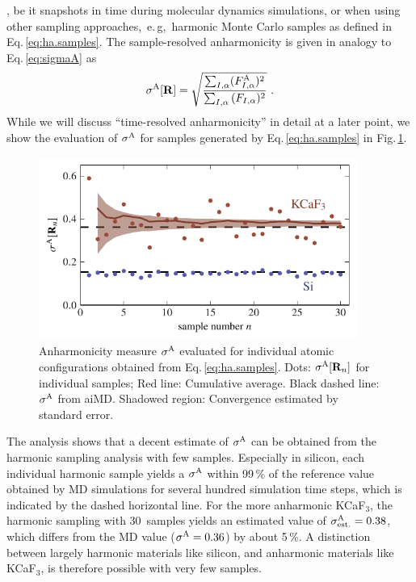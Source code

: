 , be it snapshots in time during molecular dynamics simulations, or when using other sampling approaches,~e.\,g,~harmonic Monte Carlo samples as defined in Eq.\,\eqref{eq:ha.samples}. The sample-resolved anharmonicity is given in analogy to Eq.\,\eqref{eq:sigmaA} as
\begin{align}
	\sigmaA [{\bf R}]
		= \sqrt{\frac{\sum_{I, \alpha} (F^{\rm A}_{I, \alpha})^2}{\sum_{I, \alpha} {(F_{I, \alpha})^2}}}~.
	\label{eq:sigmaA.sample}
\end{align}
While we will discuss ``time-resolved anharmonicity'' in detail at a later point, we show the evaluation of $\sigma^\mathrm{A}$ for samples generated by Eq.\,\eqref{eq:ha.samples} in Fig.\,\ref{fig:anh.sampling}.
\begin{figure}
	\includegraphics[width=4.1in]{./data/plots/anharmonicity/7_sampling/convergence_sigma_MC.pdf}
	\caption{
			Anharmonicity measure $\sigma^\mathrm{A}$ evaluated for individual atomic configurations obtained from Eq.\,\eqref{eq:ha.samples}. Dots: $\sigma^\mathrm{A} [{\bf R}_n]$ for individual samples; Red line: Cumulative average.	Black dashed line: $\sigma^\mathrm{A}$ from aiMD.	Shadowed region: Convergence estimated by standard error.
	}
	\label{fig:anh.sampling}
\end{figure}
The analysis shows that a decent estimate of $\sigma^\mathrm{A}$ can be obtained from the harmonic sampling analysis with few samples. Especially in silicon, each individual harmonic sample yields a $\sigma^\mathrm{A}$ within 99\,\% of the reference value obtained by MD simulations for several hundred simulation time steps, which is indicated by the dashed horizontal line. For the more anharmonic KCaF$_3$, the harmonic sampling with 30~samples yields an estimated value of $\sigma^\mathrm{A}_{\rm est.} = 0.38$, which differs from the MD value ($\sigma^\mathrm{A} = 0.36$) by about 5\,\%. A distinction between largely harmonic materials like silicon, and anharmonic materials like KCaF$_3$, is therefore possible with very few samples.

